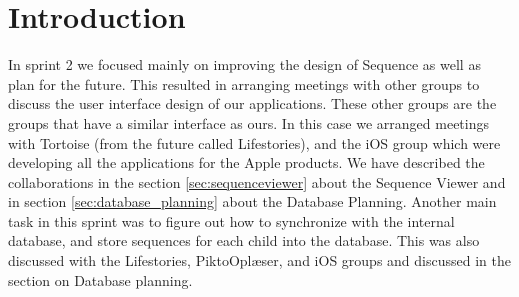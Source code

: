 \section{Introduction}
In sprint 2 we focused mainly on improving the design of Sequence as well as plan for the future. 
This resulted in arranging meetings with other groups to discuss the user interface design of our applications. These other groups are the groups that have a similar interface as ours. In this case we arranged meetings with Tortoise (from the future called Lifestories), and the iOS group which were developing all the applications for the Apple products. We have described the collaborations in the section \ref{sec:sequenceviewer} about the Sequence Viewer and in section \ref{sec:database_planning} about the Database Planning. Another main task in this sprint was to figure out how to synchronize with the internal database, and store sequences for each child into the database. This was also discussed with the Lifestories, PiktoOplæser, and iOS groups and discussed in the section on Database planning.
